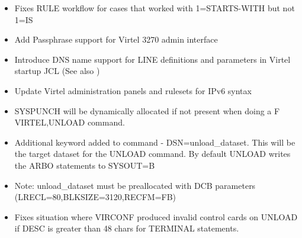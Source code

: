 \documentclass[letterpaper,10pt,english]{sphinxmanual}
\begin{document}
\newpage

\begin{itemize}
\item {} 
Fixes RULE workflow for cases that worked with 1=STARTS-WITH but not 1=IS

\end{itemize}

\begin{itemize}
\item {} 
Add Passphrase support for Virtel 3270 admin interface

\end{itemize}

\begin{itemize}
\item {} 
Introduce DNS name support for LINE definitions and parameters in Virtel startup JCL (See also )

\end{itemize}

\begin{itemize}
\item {} 
Update Virtel administration panels and rulesets for IPv6 syntax

\end{itemize}

\begin{itemize}
\item {} 
SYSPUNCH will be dynamically allocated if not present when doing a F VIRTEL,UNLOAD command.

\item {} 
Additional keyword added to command - DSN=unload\_dataset. This will be the target dataset for the UNLOAD command. By default UNLOAD writes the ARBO statements to SYSOUT=B

\item {} 
Note: unload\_dataset must be preallocated with DCB parameters (LRECL=80,BLKSIZE=3120,RECFM=FB)

\end{itemize}

\begin{itemize}
\item {} 
Fixes situation where VIRCONF produced invalid control cards on UNLOAD if DESC is greater than 48 chars for TERMINAL statements.

\end{itemize}
\end{document}
